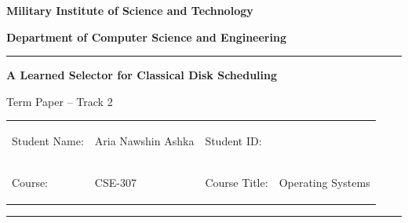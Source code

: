 \documentclass[10pt,a4paper]{article}
\begin{document}
\begin{center}
{\large\bfseries Military Institute of Science and Technology\par}
\vspace{0.05in}
{\normalsize\bfseries Department of Computer Science and Engineering\par}
\vspace{0.12in}
\rule{\textwidth}{0.5pt}\par
\vspace{0.10in}
{\LARGE\bfseries A Learned Selector for Classical Disk Scheduling\par}
\vspace{0.07in}
{\large Term Paper -- Track 2\par}
\vspace{0.13in}
\begin{tabularx}{0.90\textwidth}{@{}>{\bfseries\raggedright\arraybackslash}p{1.25in} >{\raggedright\arraybackslash}X
                                      >{\bfseries\raggedright\arraybackslash}p{0.90in} >{\raggedright\arraybackslash}p{1.15in}@{}}
Student Name: & Aria Nawshin Ashka & Student ID: & 202414021 \\
Course: & CSE-307 & Course Title: & Operating Systems \\
\end{tabularx}
\vspace{0.08in}
\rule{\textwidth}{0.5pt}
\end{center}
\vspace{-0.04in}

\begin{abstract}
No fixed disk-scheduling policy is optimal for every request pattern. This work implements FCFS, SSTF, SCAN, and C-SCAN and trains a small decision tree to choose a policy from an incoming request window. Experiments use reproducible sequential, random, and bursty synthetic workloads, disjoint training, validation, and test seeds, and explicit workload shifts. On 660 held-out 50-request windows, the main selector achieved 75.61\% tie-aware accuracy and 124,574 tracks of movement, improving on the best fixed policy, SSTF (133,276), while approaching an offline oracle (119,296). Confidence was higher on correct than incorrect predictions (0.877 versus 0.778), although an expected calibration error (ECE) of 0.148 shows overconfidence remains. A validation-selected random-forest extension improved accuracy and calibration but not seek regret, demonstrating why decision accuracy and operating-system cost must both be reported.
\end{abstract}
\end{document}
